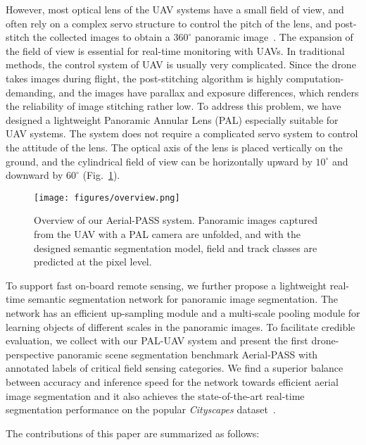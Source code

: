 \documentclass[letterpaper, 10 pt, conference]{ieeeconf}
\begin{document}
However, most optical lens of the UAV systems have a small field of view, and often rely on a complex servo structure to control the pitch of the lens, and post-stitch the collected images to obtain a $360^\circ$ panoramic image~\cite{d2012unmanned}.
The expansion of the field of view is essential for real-time monitoring with UAVs.
In traditional methods, the control system of UAV is usually very complicated.
Since the drone takes images during flight, the post-stitching algorithm is highly computation-demanding, and the images have parallax and exposure differences, which renders the reliability of image stitching rather low.
To address this problem,
we have designed a lightweight Panoramic Annular Lens (PAL) especially suitable for UAV systems.
The system does not require a complicated servo system to control the attitude of the lens. The optical axis of the lens is placed vertically on the ground, and the cylindrical field of view can be horizontally upward by $10^\circ$ and downward by $60^\circ$ (Fig.~\ref{fig:overview}). 

\begin{figure}[!t]
    \centerline{\texttt{[image: figures/overview.png]}}
    \caption{Overview of our Aerial-PASS system. Panoramic images captured from the UAV with a PAL camera are unfolded, and with the designed semantic segmentation model, field and track classes are predicted at the pixel level.}
    \label{fig:overview}
\end{figure}

To support fast on-board remote sensing, we further propose a lightweight real-time semantic segmentation network for panoramic image segmentation.
The network has an efficient up-sampling module and a multi-scale pooling module for learning objects of different scales in the panoramic images. To facilitate credible evaluation, we collect with our PAL-UAV system and present the first drone-perspective panoramic scene segmentation benchmark Aerial-PASS with annotated labels of critical field sensing categories.
We find a superior balance between accuracy and inference speed for the network towards efficient aerial image segmentation and it also achieves the state-of-the-art real-time segmentation performance on the popular \emph{Cityscapes} dataset~\cite{Cordts2016Cityscapes}. 

The contributions of this paper are summarized as follows:
\end{document}
